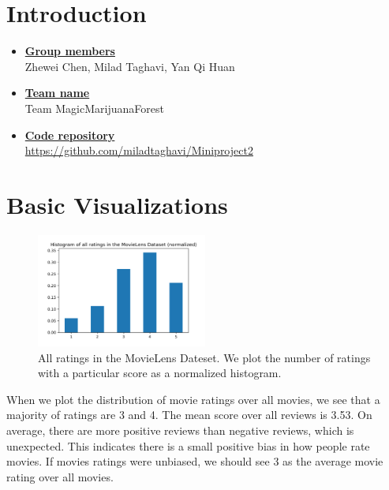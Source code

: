 \newif\ifshowsolutions
\showsolutionstrue

\newcommand{\boldline}[1]{\underline{\textbf{#1}}}



\pagestyle{fancy}

\section{Introduction}
\medskip
\begin{itemize}

    \item \boldline{Group members} \\
    Zhewei Chen, Milad Taghavi, Yan Qi Huan
    
    \item \boldline{Team name} \\
    Team MagicMarijuanaForest
    
    \item \boldline{Code repository} \\
    \url{https://github.com/miladtaghavi/Miniproject2}
\end{itemize}

\section{Basic Visualizations}

\begin{figure}[H]
		\centering
		\includegraphics[width=0.5\textwidth]{Fig4-1.png}
		\caption{All ratings in the MovieLens Dateset. We plot the number of ratings with a particular score as a normalized histogram.}
\end{figure}
	
When we plot the distribution of movie ratings over all movies, we see that a majority of ratings are 3 and 4. The mean score over all reviews is 3.53. On average, there are more positive reviews than negative reviews, which is unexpected. This indicates there is a small positive bias in how people rate movies. If movies ratings were unbiased, we should see 3 as the average movie rating over all movies.

